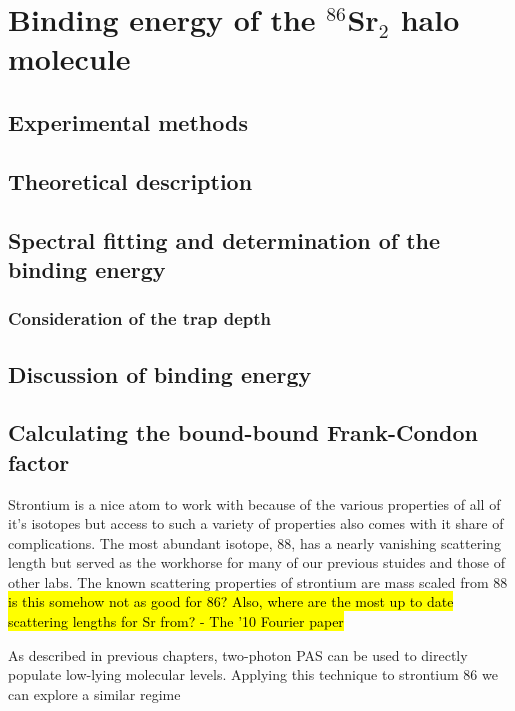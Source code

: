 \chapter{Binding energy of the $^{86}$Sr$_2$ halo molecule}
\label{ch:chap4}

\section{Experimental methods}
\label{sec:lowE_methods}

\section{Theoretical description}
\label{sec:lowE_theory}

\section{Spectral fitting and determination of the binding energy}
\label{sec:lowE_Eb2}

\subsection{Consideration of the trap depth}
\label{sec:trunc_trap}

\section{Discussion of binding energy}
\label{sec:lowE_alt}

\section{Calculating the bound-bound Frank-Condon factor}
\label{sec:lowE_coupling}

Strontium is a nice atom to work with because of the various properties of all of it's isotopes but access to such a variety of properties also comes with it share of complications. The most abundant isotope, 88, has a nearly vanishing scattering length but served as the workhorse for many of our previous stuides and those of other labs. The known scattering properties of strontium are mass scaled from 88 \hl{is this somehow not as good for 86? Also, where are the most up to date scattering lengths for Sr from? - The '10 Fourier paper}



As described in previous chapters, two-photon PAS can be used to directly populate low-lying molecular levels. Applying this technique to strontium 86 we can explore a similar regime



